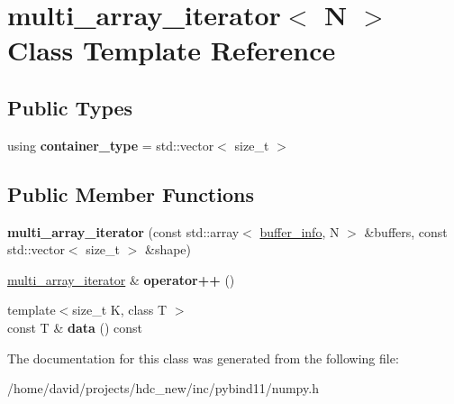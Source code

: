 \hypertarget{classmulti__array__iterator}{}\section{multi\+\_\+array\+\_\+iterator$<$ N $>$ Class Template Reference}
\label{classmulti__array__iterator}
\subsection*{Public Types}
\begin{DoxyCompactItemize}
\item 
using {\bfseries container\+\_\+type} = std\+::vector$<$ size\+\_\+t $>$\hypertarget{classmulti__array__iterator_a469b0d3c45db56727cdd676755916422}{}\label{classmulti__array__iterator_a469b0d3c45db56727cdd676755916422}

\end{DoxyCompactItemize}
\subsection*{Public Member Functions}
\begin{DoxyCompactItemize}
\item 
{\bfseries multi\+\_\+array\+\_\+iterator} (const std\+::array$<$ \hyperlink{structbuffer__info}{buffer\+\_\+info}, N $>$ \&buffers, const std\+::vector$<$ size\+\_\+t $>$ \&shape)\hypertarget{classmulti__array__iterator_a26f1ef9ecbdfb9a321c465a2437b1a19}{}\label{classmulti__array__iterator_a26f1ef9ecbdfb9a321c465a2437b1a19}

\item 
\hyperlink{classmulti__array__iterator}{multi\+\_\+array\+\_\+iterator} \& {\bfseries operator++} ()\hypertarget{classmulti__array__iterator_a7e20dd4a6014bf9d69995f6e8825ee90}{}\label{classmulti__array__iterator_a7e20dd4a6014bf9d69995f6e8825ee90}

\item 
{\footnotesize template$<$size\+\_\+t K, class T $>$ }\\const T \& {\bfseries data} () const \hypertarget{classmulti__array__iterator_a8b1d6ccdfbc3f7e39372422741438dd9}{}\label{classmulti__array__iterator_a8b1d6ccdfbc3f7e39372422741438dd9}

\end{DoxyCompactItemize}


The documentation for this class was generated from the following file\+:\begin{DoxyCompactItemize}
\item 
/home/david/projects/hdc\+\_\+new/inc/pybind11/numpy.\+h\end{DoxyCompactItemize}
